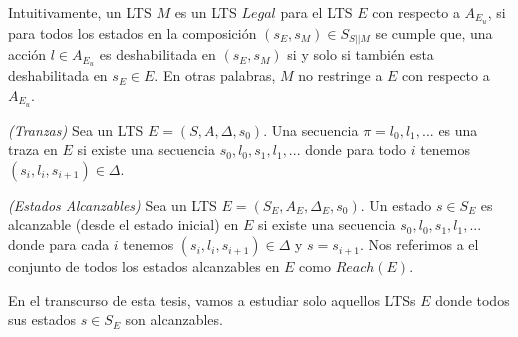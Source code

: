Intuitivamente, un LTS $M$ es un LTS $Legal$ para el LTS $E$ con respecto a $A_{E_u}$, si para todos los estados en la
composición $(s_E,s_M) \in S_{S||M}$ se cumple que, una acción $l \in A_{E_u}$ es deshabilitada en $(s_E,s_M)$ si y solo
si también esta deshabilitada en $s_E \in E$. En otras palabras, $M$ no restringe a $E$ con respecto a $A_{E_u}$.


\begin{nahaDef}
    \emph{(Tranzas)} Sea un LTS $E = (S,A,\Delta,s_0)$. Una secuencia $\pi = l_0,l_1,...$ es una traza en $E$ si existe una
    secuencia $s_0,l_0,s_1,l_1,...$ donde para todo $i$ tenemos $(s_i,l_i,s_{i+1}) \in \Delta$.
\end{nahaDef} 


\begin{nahaDef}
    \emph{(Estados Alcanzables)} Sea un LTS $E = (S_E, A_E, \Delta_E, s_0)$. Un estado $s \in S_E$ es alcanzable (desde
    el estado inicial) en $E$ si existe una secuencia $s_0,l_0,s_1,l_1,...$ donde para cada $i$ tenemos
    $(s_i,l_i,s_{i+1}) \in \Delta$ y $s = s_{i+1}$. Nos referimos a el conjunto de todos los estados alcanzables en $E$
    como $Reach(E)$.
\end{nahaDef} 

En el transcurso de esta tesis, vamos a estudiar solo aquellos LTSs $E$ donde todos sus estados $s \in S_E$ son
alcanzables.
